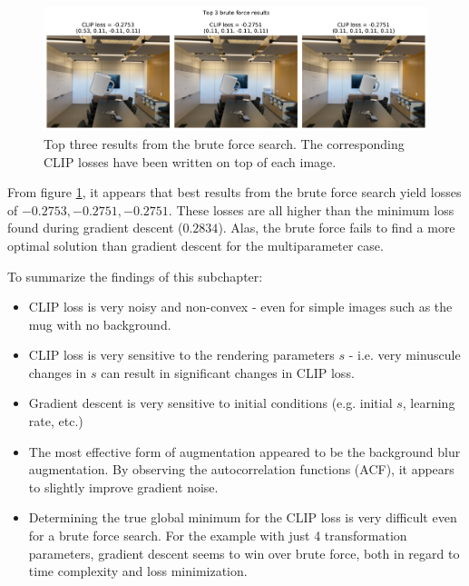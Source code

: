 \begin{figure}
    \centering
    \includegraphics[width=1.0\textwidth]{figures/3_2-brute-force.pdf}
    \caption{Top three results from the brute force search. The corresponding CLIP losses have been written on top of each image.}
    \label{fig:3_2-brute-force}
\end{figure}

From figure \ref{fig:3_2-brute-force}, it appears that best results from the brute force search yield losses of $-0.2753, -0.2751, -0.2751$. These losses are all higher than the minimum loss found during gradient descent ($0.2834$). Alas, the brute force fails to find a more optimal solution than gradient descent for the multiparameter case.


To summarize the findings of this subchapter:
\begin{itemize}[noitemsep]
    \item CLIP loss is very noisy and non-convex - even for simple images such as the mug with no background.

    \item CLIP loss is very sensitive to the rendering parameters $s$ - i.e. very minuscule changes in $s$ can result in significant changes in CLIP loss.

    \item Gradient descent is very sensitive to initial conditions (e.g. initial $s$, learning rate, etc.)
    
    \item The most effective form of augmentation appeared to be the background blur augmentation. By observing the autocorrelation functions (ACF), it appears to slightly improve gradient noise.

    \item Determining the true global minimum for the CLIP loss is very difficult even for a brute force search. For the example with just 4 transformation parameters, gradient descent seems to win over brute force, both in regard to time complexity and loss minimization.
\end{itemize}


